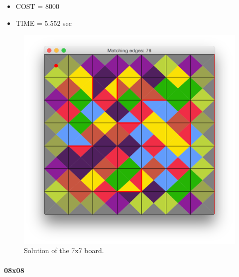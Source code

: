 	\begin{itemize}
		\item COST = 8000
		\item TIME = 5.552 sec
	\end{itemize}
	\begin{figure}[H]
	\centering
	\includegraphics[scale=0.25]{img/sol_07x07}
	\caption{Solution of the 7x7 board.}
	\end{figure}



	\paragraph{08x08}
	

